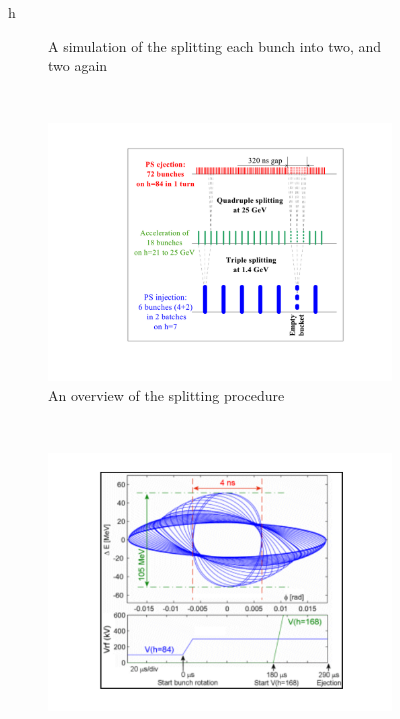 \begin{figure}{h}
\begin{subfigure}[h]{0.45\textwidth}
        \caption{A simulation of the splitting each bunch into two,
          and two again \cite{LHC:TDR_Vol3_InjectionChain_Benedikt} }\label{fig:ps_split2x2}
      \end{subfigure}
       ~ %
      \begin{subfigure}[h]{0.45\textwidth}
        \includegraphics[width=\textwidth]{Figures/LHC_Diagrams/LHC__PS__BunchSplittingDiagram.pdf}
        \caption{An overview of the splitting procedure \cite{LHC:TDR_Vol3_InjectionChain_Benedikt}}\label{fig:ps_splitting}
      \end{subfigure}
      ~ %
      \begin{subfigure}[h]{0.45\textwidth}
        \includegraphics[width=\textwidth]{Figures/LHC_Diagrams/LHC__PS__BunchCompression.pdf}

\end{subfigure}
\end{figure}
